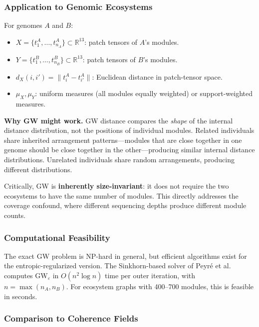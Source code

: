 \documentclass{../yalumba}
\begin{document}
\subsubsection{Application to Genomic Ecosystems}

For genomes $A$ and $B$:
\begin{itemize}
  \item $X = \{t_1^A, \ldots, t_{n_A}^A\} \subset \mathbb{R}^{13}$:
    patch tensors of $A$'s modules.
  \item $Y = \{t_1^B, \ldots, t_{n_B}^B\} \subset \mathbb{R}^{13}$:
    patch tensors of $B$'s modules.
  \item $d_X(i, i') = \|t_i^A - t_{i'}^A\|$: Euclidean distance in
    patch-tensor space.
  \item $\mu_X, \mu_Y$: uniform measures (all modules equally weighted)
    or support-weighted measures.
\end{itemize}

\begin{keyfinding}
\textbf{Why GW might work.}  GW distance compares the \emph{shape} of
the internal distance distribution, not the positions of individual
modules.  Related individuals share inherited arrangement
patterns---modules that are close together in one genome should be close
together in the other---producing similar internal distance
distributions.  Unrelated individuals share random arrangements,
producing different distributions.

Critically, GW is \textbf{inherently size-invariant}: it does not
require the two ecosystems to have the same number of modules.  This
directly addresses the coverage confound, where different sequencing
depths produce different module counts.
\end{keyfinding}

\subsubsection{Computational Feasibility}

The exact GW problem is NP-hard in general, but efficient algorithms
exist for the entropic-regularized version.  The Sinkhorn-based solver
of Peyré et al.~\cite{peyre2019computational} computes
$\mathrm{GW}_\varepsilon$ in $O(n^2 \log n)$ time per outer iteration,
with $n = \max(n_A, n_B)$.  For ecosystem graphs with 400--700 modules,
this is feasible in seconds.

\subsubsection{Comparison to Coherence Fields}
\end{document}
